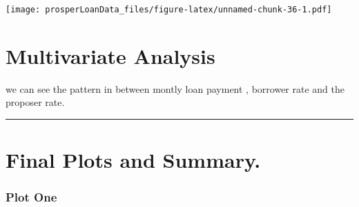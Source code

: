 \documentclass[]{article}
\begin{document}
\texttt{[image: prosperLoanData\_files/figure-latex/unnamed-chunk-36-1.pdf]}

\hypertarget{multivariate-analysis}{%
\section{Multivariate Analysis}\label{multivariate-analysis}}

we can see the pattern in between montly loan payment , borrower rate
and the proposer rate.

\begin{center}\rule{0.5\linewidth}{\linethickness}\end{center}

\hypertarget{final-plots-and-summary.}{%
\section{Final Plots and Summary.}\label{final-plots-and-summary.}}

\hypertarget{plot-one}{%
\subsubsection{Plot One}\label{plot-one}}
\end{document}
